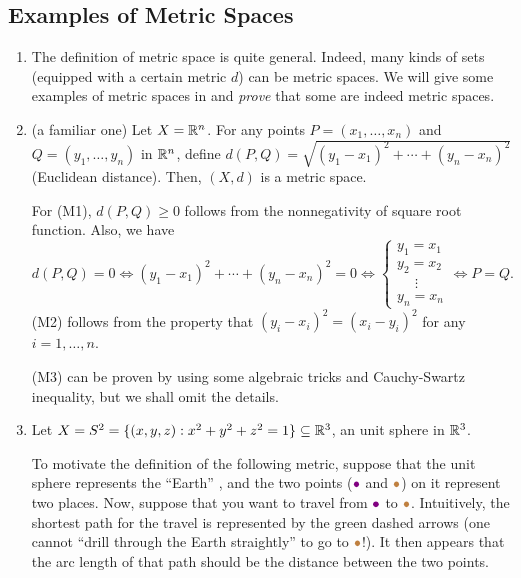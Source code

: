 \subsection{Examples of Metric Spaces}
\label{subsect:metric-sp-eg}
\begin{enumerate}
\item The definition of metric space is quite general. Indeed, many kinds of
sets (equipped with a certain metric \(d\)) can be metric spaces. We will give
some examples of metric spaces in  and \emph{prove}
that some are indeed metric spaces.

\item \label{it:metric-rn}
(a familiar one) Let \(X=\mathbb{R}^n\). For any points \(P=(x_1,\dotsc,x_n)\)
and \(Q=(y_1,\dotsc,y_n)\) in \(\mathbb{R}^n\), define
\(d(P,Q)=\sqrt{(y_1-x_1)^{2}+\dotsb+(y_n-x_n)^{2}}\) (Euclidean distance).
Then, \((X,d)\) is a metric space.

\begin{pf}
For (M1), \(d(P,Q)\ge 0\) follows from the nonnegativity of square root
function. Also, we have
\[
d(P,Q)=0\iff (y_1-x_1)^{2}+\dotsb+(y_n-x_n)^{2}=0
\iff \begin{cases}
y_1=x_1\\
y_2=x_2\\
\quad\;\vdots\\
y_n=x_n
\end{cases}
\iff
P=Q.
\]
(M2) follows from the property that \((y_i-x_i)^{2}=(x_i-y_i)^{2}\) for any
\(i=1,\dotsc,n\).

(M3) can be proven by using some algebraic tricks and Cauchy-Swartz inequality,
but we shall omit the details.
\end{pf}

\item Let \(X=S^2=\{(x,y,z):x^2+y^2+z^2=1\}\subseteq\mathbb{R}^3\), an unit sphere in
\(\mathbb{R}^3\).
\begin{center}
\end{center}
To motivate the definition of the following metric, suppose that the unit
sphere represents the ``Earth'' , and the two points
(\({\color{violet}\bullet}\) and \({\color{brown}\bullet}\)) on it represent
two places. Now, suppose that you want to travel  from
\({\color{violet}\bullet}\) to \({\color{brown}\bullet}\). Intuitively, the
shortest path for the travel is represented by the {\color{green!50!black}green
dashed arrows} (one cannot ``drill through the Earth straightly'' to go to
\({\color{brown}\bullet}\)!). It then appears that the arc length of that path
should be the distance between the two points.


\end{enumerate}
